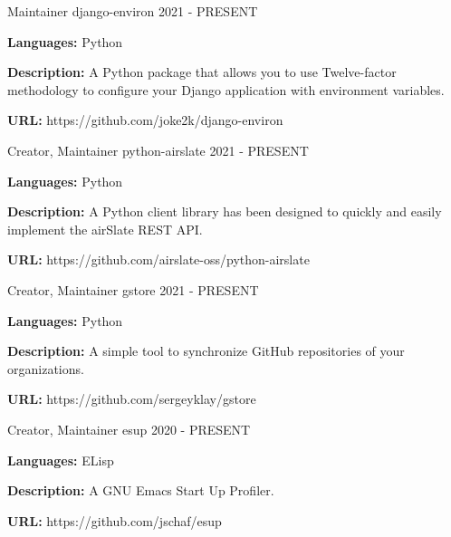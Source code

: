 
\begin{cventries}

  \cventry
    {Maintainer}
    {django-environ}
    {}
    {2021 - PRESENT}
    {
      \begin{cvitems}
        \item {\textbf{Languages:} Python}
        \item {\textbf{Description:} A Python package that allows you to use Twelve-factor methodology to configure your Django application with environment variables.}
        \item {\textbf{URL:} https://github.com/joke2k/django-environ}
      \end{cvitems}
    }

  \cventry
    {Creator, Maintainer}
    {python-airslate}
    {}
    {2021 - PRESENT}
    {
      \begin{cvitems}
        \item {\textbf{Languages:} Python}
        \item {\textbf{Description:} A Python client library has been designed to quickly and easily implement the airSlate REST API.}
        \item {\textbf{URL:} https://github.com/airslate-oss/python-airslate}
      \end{cvitems}
    }

  \cventry
    {Creator, Maintainer}
    {gstore}
    {}
    {2021 - PRESENT}
    {
      \begin{cvitems}
        \item {\textbf{Languages:} Python}
        \item {\textbf{Description:} A simple tool to synchronize GitHub repositories of your organizations.}
        \item {\textbf{URL:} https://github.com/sergeyklay/gstore}
      \end{cvitems}
    }

  \cventry
    {Creator, Maintainer}
    {esup}
    {}
    {2020 - PRESENT}
    {
      \begin{cvitems}
        \item {\textbf{Languages:} ELisp}
        \item {\textbf{Description:} A GNU Emacs Start Up Profiler.}
        \item {\textbf{URL:} https://github.com/jschaf/esup}
      \end{cvitems}
    }


\end{cventries}
